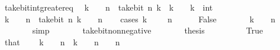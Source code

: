 \begin{isabellebody}
\isamarkupfalse%
%
\endisatagproof
{\isafoldproof}%
%
\isadelimproof
\isanewline
%
\endisadelimproof
\isanewline
{}\isamarkupfalse%
\ take{\isacharunderscore}{\kern0pt}bit{\isacharunderscore}{\kern0pt}int{\isacharunderscore}{\kern0pt}greater{\isacharunderscore}{\kern0pt}eq{\isacharcolon}{\kern0pt}\isanewline
\ \ {\isacartoucheopen}k\ {\isacharplus}{\kern0pt}\ {}\ {\isacharcircum}{\kern0pt}\ n\ {\isasymle}\ take{\isacharunderscore}{\kern0pt}bit\ n\ k{\isacartoucheclose}\ \ {\isacartoucheopen}k\ {\isacharless}{\kern0pt}\ {}{\isacartoucheclose}\ \ k\ {\isacharcolon}{\kern0pt}{\isacharcolon}{\kern0pt}\ int\isanewline
%
\isadelimproof
%
\endisadelimproof
%
\isatagproof
{}\isamarkupfalse%
\ {\isacharminus}{\kern0pt}\isanewline
\ \ \isamarkupfalse%
\ {\isacartoucheopen}k\ {\isacharplus}{\kern0pt}\ {}\ {\isacharcircum}{\kern0pt}\ n\ {\isasymle}\ take{\isacharunderscore}{\kern0pt}bit\ n\ {\isacharparenleft}{\kern0pt}k\ {\isacharplus}{\kern0pt}\ {}\ {\isacharcircum}{\kern0pt}\ n{\isacharparenright}{\kern0pt}{\isacartoucheclose}\isanewline
\ \ \isamarkupfalse%
\ {\isacharparenleft}{\kern0pt}cases\ {\isacartoucheopen}k\ {\isachargreater}{\kern0pt}\ {\isacharminus}{\kern0pt}\ {\isacharparenleft}{\kern0pt}{}\ {\isacharcircum}{\kern0pt}\ n{\isacharparenright}{\kern0pt}{\isacartoucheclose}{\isacharparenright}{\kern0pt}\isanewline
\ \ \ \ \isamarkupfalse%
\ False\isanewline
\ \ \ \ \isamarkupfalse%
\ \isamarkupfalse%
\ {\isacartoucheopen}k\ {\isacharplus}{\kern0pt}\ {}\ {\isacharcircum}{\kern0pt}\ n\ {\isasymle}\ {}{\isacartoucheclose}\isanewline
\ \ \ \ \ \ \isamarkupfalse%
\ simp\isanewline
\ \ \ \ \isamarkupfalse%
\ \isamarkupfalse%
\ take{\isacharunderscore}{\kern0pt}bit{\isacharunderscore}{\kern0pt}nonnegative\isanewline
\ \ \ \ \isamarkupfalse%
\ \isamarkupfalse%
\ {\isacharquery}{\kern0pt}thesis\ \isacommand{{\isachardot}{\kern0pt}}\isamarkupfalse%
\isanewline
\ \ \isamarkupfalse%
\isanewline
\ \ \ \ \isamarkupfalse%
\ True\isanewline
\ \ \ \ \isamarkupfalse%
\ that\ \isamarkupfalse%
\ {\isacartoucheopen}{}\ {\isasymle}\ k\ {\isacharplus}{\kern0pt}\ {}\ {\isacharcircum}{\kern0pt}\ n{\isacartoucheclose}\ \ {\isacartoucheopen}k\ {\isacharplus}{\kern0pt}\ {}\ {\isacharcircum}{\kern0pt}\ n\ {\isacharless}{\kern0pt}\ {}\ {\isacharcircum}{\kern0pt}\ n{\isacartoucheclose}\isanewline

\end{isabellebody}
